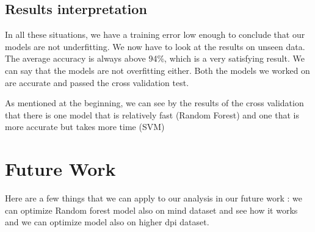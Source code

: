 \documentclass[conference]{IEEEtran}
\begin{document}
\subsection{Results interpretation}

\textcolor{baptiste}{In all these situations, we have a training error low enough to conclude that our models are not underfitting. We now have to look at the results on unseen data. The average accuracy is always above 94\%, which is a very satisfying result. We can say that the models are not overfitting either. Both the models we worked on are accurate and passed the cross validation test.}

\textcolor{baptiste}{As mentioned at the beginning, we can see by the results of the cross validation that there is one model that is relatively fast (Random Forest) and one that is more accurate but takes more time (SVM)}

\section{Future Work}
Here are a few things that we can apply to our analysis in our future work : we can optimize Random forest model also on mind dataset and see how it works and we can optimize model also on higher dpi dataset. 




\end{document}
